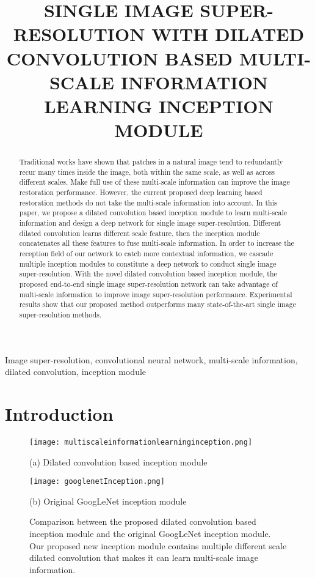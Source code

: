 \documentclass{article}
\title{SINGLE IMAGE SUPER-RESOLUTION WITH DILATED CONVOLUTION BASED MULTI-SCALE INFORMATION LEARNING INCEPTION MODULE}
\begin{document}
\maketitle
\begin{abstract}
Traditional works have shown that patches in a natural image tend to redundantly recur many times inside the image, both within the same scale, as well as across different scales. Make full use of these multi-scale information can improve the image restoration performance. However, the current proposed deep learning based restoration methods do not take the multi-scale information into account. In this paper, we propose a dilated convolution based inception module to learn multi-scale information and design a deep network for single image super-resolution. Different dilated convolution learns different scale feature, then the inception module concatenates all these features to fuse multi-scale information. In order to increase the reception field of our network to catch more contextual information, we cascade multiple inception modules to constitute a deep network to conduct single image super-resolution. With the novel dilated convolution based inception module, the proposed end-to-end single image super-resolution network can take advantage of multi-scale information to improve image super-resolution performance. Experimental results show that our proposed method outperforms many state-of-the-art single image super-resolution methods.
\end{abstract}
\begin{keywords}
Image super-resolution, convolutional neural network, multi-scale information, dilated convolution, inception module
\end{keywords}
\section{Introduction}
\label{sec:intro}


\begin{figure}[htb]

\begin{minipage}[b]{1.0\linewidth}
  \centering
  \centerline{\texttt{[image: multiscaleinformationlearninginception.png]}}
\centerline{(a) Dilated convolution based inception module}\medskip
\end{minipage}
\begin{minipage}[b]{1.0\linewidth}
  \centering
  \centerline{\texttt{[image: googlenetInception.png]}}
\centerline{(b) Original GoogLeNet inception module~\cite{ref14}}\medskip
\end{minipage}
\vspace{-0.98cm}
\caption{Comparison between the proposed dilated convolution based inception module and the original GoogLeNet inception module. Our proposed new inception module contains multiple different scale dilated convolution that makes it can learn multi-scale image information.}
\label{fig:comparison}
\vspace{-0.6cm}
\end{figure}
\end{document}
